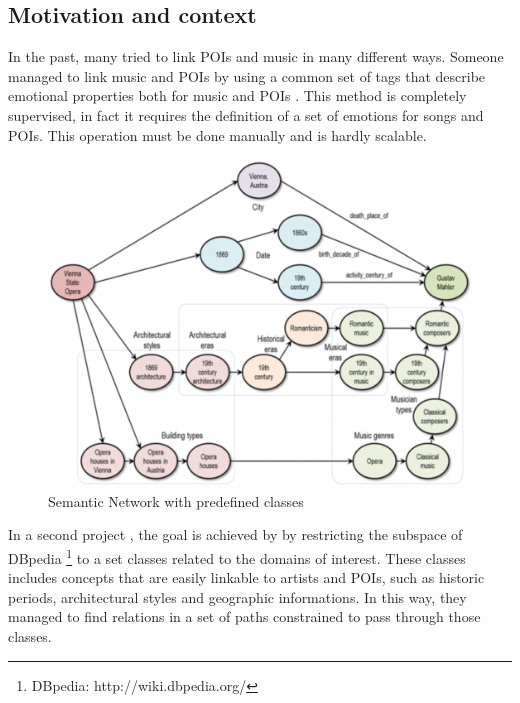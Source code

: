 \documentclass[paper=a4, fontsize=11pt]{scrartcl}
\begin{document}
\subsection{Motivation and context}
In the past, many tried to link POIs and music in many different ways. Someone managed to link music and POIs by using a common set of tags that describe emotional properties both for music and POIs \cite{Kaminskas:2013:LMR:2507157.2507180}. This method is completely supervised, in fact it requires the definition of a set of emotions for songs and POIs. This operation must be done manually and is hardly scalable.
\begin{figure}[!htb]
  \centering 
    \includegraphics[width=1\textwidth]{images/semantic_net.png}
    \caption{Semantic Network with predefined classes}
\end{figure}

In a second project \cite{Kaminskas:2012:KMR:2390848.2390854}, the goal is achieved by by restricting the subspace of DBpedia \footnote{DBpedia: http://wiki.dbpedia.org/} to a set classes related to the domains of interest. These classes includes concepts that are easily linkable to artists and POIs, such as historic periods, architectural styles and geographic informations. In this way, they managed to find relations in a set of paths constrained to pass through those classes.
\end{document}
